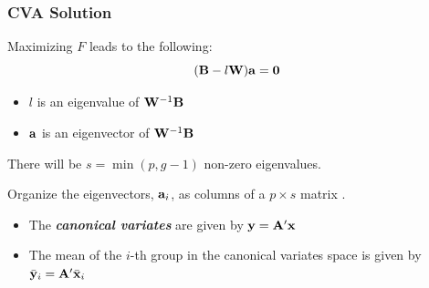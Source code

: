 \documentclass{beamer}
\begin{document}
\begin{frame}
  \frametitle{CVA Solution}

Maximizing $F$ leads to the following:
\[
(\mathbf{B} - l\mathbf{W})\mathbf{a} = \mathbf{0}
\]

\begin{itemize}
\item $l$ is an eigenvalue of $\mathbf{W}^{-1}\mathbf{B}$
\item $\mathbf{a}$ is an eigenvector of $\mathbf{W}^{-1}\mathbf{B}$
\end{itemize}

There will be $s=\min(p, g-1)$ non-zero eigenvalues.
\medskip

Organize the eigenvectors, $\mathbf{a}_i$, as columns of a $p \times s $ matrix .
\begin{itemize}
\item The \textbf{\emph{canonical variates}} are given by $\mathbf{y} = \mathbf{A}'\mathbf{x}$
\item The mean of the $i$-th group in the canonical variates space is given by $\bar{\mathbf{y}}_i = \mathbf{A}'\bar{\mathbf{x}}_i$
\end{itemize}

\end{frame}
\end{document}

